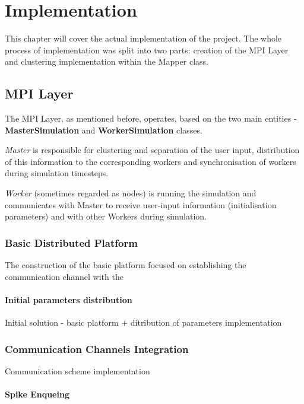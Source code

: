 \chapter{Implementation}

This chapter will cover the actual implementation of the project. The whole process of implementation was split into two parts: creation of the MPI Layer and clustering implementation within the Mapper class.

\section{MPI Layer}

The MPI Layer, as mentioned before, operates, based on the two main entities - \textbf{MasterSimulation} and \textbf{WorkerSimulation} classes.

\emph{Master} is responsible for clustering and separation of the user input, distribution of this information to the corresponding workers and synchronisation of workers during simulation timesteps.

\emph{Worker} (sometimes regarded as nodes) is running the simulation and communicates with Master to receive user-input information (initialisation parameters) and with other Workers during simulation.

\subsection{Basic Distributed Platform}

The construction of the basic platform focused on establishing the communication channel with the 

\subsubsection{Initial parameters distribution}

Initial solution - basic platform + ditribution of parameters implementation

\subsection{Communication Channels Integration}

Communication scheme implementation

\subsubsection{Spike Enqueing}

